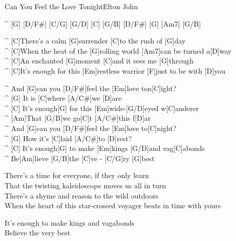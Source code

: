 \begin{song}{Can You Feel the Love Tonight}{Elton John}


\begin{guitar}
^ [G] [D/F#] [C/G] [G/D] [C] [G/B] [D/F#] [G] [Am7] [G/B]\\

\end{guitar}

\begin{guitar}
^ [C]There's a calm [G]surrender [C]to the rush of [G]day\\
^ [C]When the heat of the [G]rolling world [Am7]can be turned a[D]way\\
^ [C]An enchanted [G]moment [C]and it sees me [G]through\\
^ [C]It's enough for this [Em]restless warrior [F]just to be with [D]you\\
\end{guitar}


\begin{guitar}
^ And [G]can you [D/F#]feel the [Em]love ton[C]ight?\\
^ [G] It is [C]where [A/C#]we   [D]are\\
^ [C] It's enough[G] for this [Em]wide-[G/D]eyed w[C]anderer\\
^ [Am]That [G/B]we go[C]t [A/C#]this f[D]ar\\
^ And [G]can you [D/F#]feel the [Em]love to[C]night?\\
^ [G] How it's [C]laid [A/C#]to   [D]rest?\\
^ [C] It's enough[G] to make [Em]kings [G/D]and vag[C]abonds\\
^ Be[Am]lieve [G/B]the  [C]ve - [C/G]ry    [G]best\\
\end{guitar}



\begin{guitar}
There's a time for everyone, if they only learn\\
That the twisting kaleidoscope moves us all in turn\\
There's a rhyme and reason to the wild outdoors\\
When the heart of this star-crossed voyager beats in time with yours\hspace{-1cm}\\
\end{guitar}



\begin{guitar}
It's enough to make kings and vagabonds\\
Believe the  very  best\\
\end{guitar}
\end{song}
